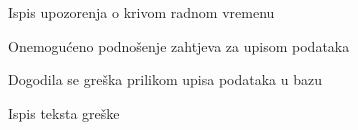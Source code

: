 \begin{packed_item}
\begin{packed_item}
\begin{packed_enum}
								\item Ispis upozorenja o krivom radnom vremenu
								\item Onemogućeno podnošenje zahtjeva za upisom podataka
								
							\end{packed_enum}
							
							\item[4.a] Dogodila se greška prilikom upisa podataka u bazu
							\item[] \begin{packed_enum}
								
								\item Ispis teksta greške
								
							\end{packed_enum}
							
						\end{packed_item}
					\end{packed_item}
					
